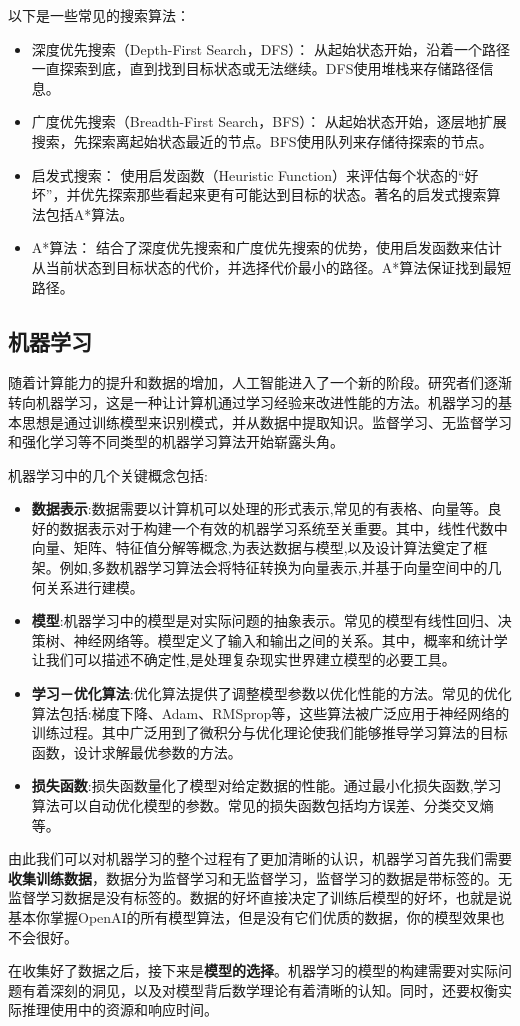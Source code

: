 以下是一些常见的搜索算法：
\begin{itemize}
\item 深度优先搜索（Depth-First Search，DFS）： 从起始状态开始，沿着一个路径一直探索到底，直到找到目标状态或无法继续。DFS使用堆栈来存储路径信息。
\item 广度优先搜索（Breadth-First Search，BFS）： 从起始状态开始，逐层地扩展搜索，先探索离起始状态最近的节点。BFS使用队列来存储待探索的节点。
\item 启发式搜索： 使用启发函数（Heuristic Function）来评估每个状态的“好坏”，并优先探索那些看起来更有可能达到目标的状态。著名的启发式搜索算法包括A*算法。
\item A*算法： 结合了深度优先搜索和广度优先搜索的优势，使用启发函数来估计从当前状态到目标状态的代价，并选择代价最小的路径。A*算法保证找到最短路径。
\end{itemize}

\subsection{机器学习}

随着计算能力的提升和数据的增加，人工智能进入了一个新的阶段。研究者们逐渐转向机器学习，这是一种让计算机通过学习经验来改进性能的方法。机器学习的基本思想是通过训练模型来识别模式，并从数据中提取知识。监督学习、无监督学习和强化学习等不同类型的机器学习算法开始崭露头角。

机器学习中的几个关键概念包括:
\begin{itemize}
\item \textbf{数据表示}:数据需要以计算机可以处理的形式表示,常见的有表格、向量等。良好的数据表示对于构建一个有效的机器学习系统至关重要。其中，线性代数中向量、矩阵、特征值分解等概念,为表达数据与模型,以及设计算法奠定了框架。例如,多数机器学习算法会将特征转换为向量表示,并基于向量空间中的几何关系进行建模。

\item \textbf{模型}:机器学习中的模型是对实际问题的抽象表示。常见的模型有线性回归、决策树、神经网络等。模型定义了输入和输出之间的关系。其中，概率和统计学让我们可以描述不确定性,是处理复杂现实世界建立模型的必要工具。

\item \textbf{学习－优化算法}:优化算法提供了调整模型参数以优化性能的方法。常见的优化算法包括:梯度下降、Adam、RMSprop等，这些算法被广泛应用于神经网络的训练过程。其中广泛用到了微积分与优化理论使我们能够推导学习算法的目标函数，设计求解最优参数的方法。

\item \textbf{损失函数}:损失函数量化了模型对给定数据的性能。通过最小化损失函数,学习算法可以自动优化模型的参数。常见的损失函数包括均方误差、分类交叉熵等。
\end{itemize}

由此我们可以对机器学习的整个过程有了更加清晰的认识，机器学习首先我们需要\textbf{收集训练数据}，数据分为监督学习和无监督学习，监督学习的数据是带标签的。无监督学习数据是没有标签的。数据的好坏直接决定了训练后模型的好坏，也就是说基本你掌握OpenAI的所有模型算法，但是没有它们优质的数据，你的模型效果也不会很好。

在收集好了数据之后，接下来是\textbf{模型的选择}。机器学习的模型的构建需要对实际问题有着深刻的洞见，以及对模型背后数学理论有着清晰的认知。同时，还要权衡实际推理使用中的资源和响应时间。



